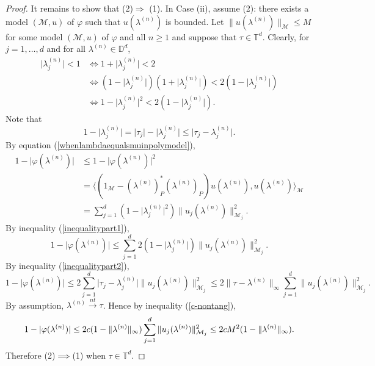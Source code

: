 \documentclass[11pt, reqno]{amsart}
\newcommand\1{\boldsymbol {1}}
\numberwithin{equation}{section}
\begin{document}
\begin{proof}
It remains to show that (2)$\Rightarrow$ (1).
In Case (ii), assume (2):  there exists  a  model $(\mathcal{M},u)$ of  $ \varphi$   such  that $u(\lambda^{(n)})$ is  bounded. 
Let $\|u(\lambda^{(n)})\|_{\mathcal{M}}\leq M$ for some model $(\mathcal{M},u)$ of $\varphi$ and all $n\geq 1$ and suppose that $\tau\in\mathbb{T}^{d}$. Clearly, for $j=1,\hdots,d$ and for all $\lambda^{(n)}\in\mathbb{D}^{d}$,
\begin{align}
\lvert \lambda^{(n)}_{j} \rvert < 1 &\iff 1+\lvert \lambda^{(n)}_{j} \rvert < 2 \nonumber\\
    & \iff (1-\lvert \lambda^{(n)}_{j}\rvert )(1+\lvert \lambda^{(n)}_{j} \rvert) < 2(1-\lvert \lambda^{(n)}_{j}\rvert) \nonumber\\
    & \iff 1-\lvert \lambda^{(n)}_{j} \rvert^{2} < 2(1-\lvert \lambda^{(n)}_{j}\rvert)\label{inequalitypart1}.
\end{align}
Note that
\begin{equation}\label{inequalitypart2}
1-\lvert \lambda^{(n)}_{j}\rvert = \lvert \tau_{j}\rvert-\lvert \lambda^{(n)}_{j}\rvert \leq \lvert \tau_{j}-\lambda^{(n)}_{j}\rvert.
\end{equation}
By equation (\ref{whenlambdaequalsmuinpolymodel}),
\begin{align*}
1-\lvert \varphi(\lambda^{(n)})\rvert &\leq 1-\lvert\varphi(\lambda^{(n)})\rvert^{2}\\
    &=\bigg\langle(1_{\mathcal{M}}-(\lambda^{(n)})_{P}^{*}(\lambda^{(n)})_{P})u(\lambda^{(n)}),u(\lambda^{(n)})\bigg\rangle_{\mathcal{M}}\\
     &=\sum_{j=1}^{d}(1-\lvert \lambda^{(n)}_{j}\rvert^{2})\|u_{j}(\lambda^{(n)})\|_{\mathcal{M}_{j}}^{2}.
\end{align*}
By inequality (\ref{inequalitypart1}),
$$1-\lvert \varphi(\lambda^{(n)})\rvert \leq \sum_{j=1}^{d}2(1-\lvert \lambda^{(n)}_{j}\rvert)\|u_{j}(\lambda^{(n)})\|_{\mathcal{M}_{j}}^{2}.
$$
By inequality (\ref{inequalitypart2}),
$$1-\lvert \varphi(\lambda^{(n)})\rvert     \leq 2\sum_{j=1}^{d}\lvert \tau_{j}-\lambda^{(n)}_{j}\rvert\|u_{j}(\lambda^{(n)})\|_{\mathcal{M}_{j}}^{2}
    \leq 2\|\tau-\lambda^{(n)}\|_{\infty}\sum_{j=1}^{d}\|u_{j}(\lambda^{(n)})\|_{\mathcal{M}_{j}}^{2}.$$
By assumption, $\lambda^{(n)}{\overset{nt}\rightarrow}\tau$. Hence by inequality (\ref{c-nontang}),
$$1-\lvert \varphi(\lambda^{(n)})\rvert     \leq 2c(1-\|\lambda^{(n)}\|_{\infty})\sum_{j=1}^{d}\|u_{j}(\lambda^{(n)})\|_{\mathcal{M}_{j}}^{2}\\
    \leq 2cM^{2}(1-\|\lambda^{(n)}\|_{\infty}).$$
Therefore (2)$\implies$(1) when $\tau\in\mathbb{T}^{d}$.


\end{proof}
\end{document}
